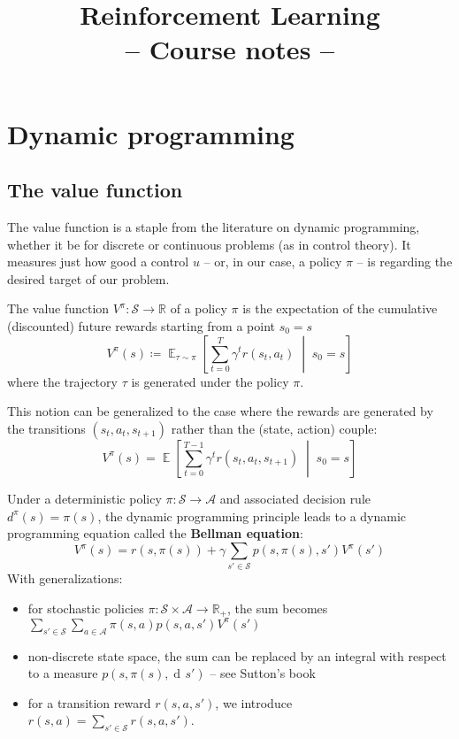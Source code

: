 \documentclass[12pt]{report}
\title{
{\sffamily\Huge
	\textbf{Reinforcement Learning}\\
	{\bluefont-- Course notes --}
}
}
\date{}
\newcommand\RR{\mathbb{R}}
\newcommand{\scalemid}{\;\middle|\;}
\DeclareMathOperator{\EE}{\mathbb{E}}
\newcommand{\der}{\operatorname{d\!}{}}
\newcommand{\calA}{\mathcal{A}}
\newcommand{\calS}{\mathcal{S}}
\newcommand{\bluefont}{\color{Blue}}
\begin{document}
\maketitle


\chapter{Dynamic programming}

\section{The value function}

The value function is a staple from the literature on dynamic programming, whether it be for discrete or continuous problems (as in control theory). It measures just how good a control $u$ -- or, in our case, a policy $\pi$ -- is regarding the desired target of our problem.


\begin{defn}
The value function $V^\pi\colon \calS \to \RR$ of a policy $\pi$ is the expectation of the cumulative (discounted) future rewards starting from a point $s_0 = s$
\begin{equation}
	V^\pi(s) \coloneqq
	\EE_{\tau\sim\pi}\left[
	\sum_{t=0}^T \gamma^t r(s_t, a_t)
	\scalemid s_0 = s
	\right]
\end{equation}
where the trajectory $\tau$ is generated under the policy $\pi$.
\end{defn}

This notion can be generalized to the case where the rewards are generated by the transitions $(s_t, a_t, s_{t+1})$ rather than the (state, action) couple:
\[
	V^\pi(s) = \EE\left[
	\sum_{t=0}^{T-1} \gamma^t r(s_t, a_t, s_{t+1})
	\scalemid s_0 = s
	\right]
\]

Under a deterministic policy $\pi\colon \calS \to \calA$ and associated decision rule $d^\pi(s) = \pi(s)$, the dynamic programming principle leads to a dynamic programming equation called the \textbf{\bluefont Bellman equation}:
\begin{equation}
	V^\pi(s) = r(s, \pi(s)) + \gamma\sum_{s'\in\calS} p(s, \pi(s), s')V^\pi(s')
\end{equation}
With generalizations:
\begin{itemize}
	\item for stochastic policies $\pi\colon \calS\times\calA \to \RR_+$, the sum becomes $\sum_{s'\in\calS} \sum_{a\in\calA} \pi(s,a) p(s,a,s')V^\pi(s')$
	\item non-discrete state space, the sum can be replaced by an integral with respect to a measure $p(s,\pi(s),\der s')$ -- see Sutton's book \cite{Sutton1998}
	\item for a transition reward $r(s,a,s')$, we introduce $r(s,a) = \sum_{s'\in\calS}r(s,a,s')$.
\end{itemize}
\end{document}

